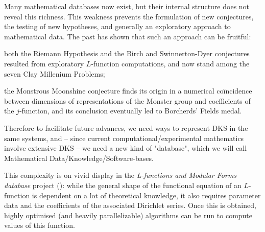 \begin{workpackage}[id=dksbases,wphases=1-48!.5,
  title=Data/Knowledge/Software-Bases,lead=JU,
  ZHRM=12,JURM=36,USHRM=12,UWRM=3,SARM=9]
\begin{wpdescription}
Many mathematical databases now exist, but their internal structure does not reveal this richness. This weakness prevents the formulation of new conjectures, the testing of new hypotheses, and generally an exploratory approach to mathematical data. The past has shown that such an approach can be fruitful: 
\begin{compactitem}
\item both the Riemann Hypothesis and the Birch and Swinnerton-Dyer conjectures resulted from exploratory $L$-function computations, and now stand among the seven Clay Millenium Problems;
\item the Monstrous Moonshine conjecture finds its origin in a numerical co\"incidence between dimensions of representations of the Monster group and coefficients of the $j$-function, and its conclusion eventually led to Borcherds' Fields medal.
\end{compactitem}

Therefore to facilitate future advances, we need ways to represent DKS in the same systems, and -- since current computational/experimental mathematics involve extensive DKS -- we need a new kind of "database", which we will call Mathematical Data/Knowledge/Software-bases.

This complexity is on vivid display in the \emph{L-functions and Modular Forms database} project (\LMFDB): while the general shape of the functional equation of an $L$-function is dependent on a lot of theoretical knowledge, it also requires parameter data and the coefficients of the associated Dirichlet series. Once this is obtained, highly optimised (and heavily parallelizable) algorithms can be run to compute values of this function. 


\end{wpdescription}
\end{workpackage}
